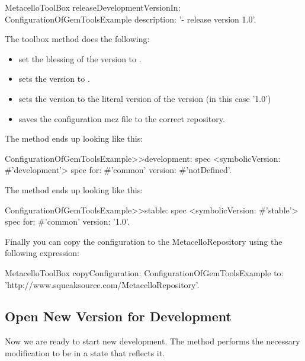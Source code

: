 \documentclass[a4paper,10pt,twoside]{book}
\begin{document}
\begin{code}{}
  MetacelloToolBox
     releaseDevelopmentVersionIn: ConfigurationOfGemToolsExample
     description: '- release version 1.0'.
\end{code}     

The toolbox method  does the following:
\begin{itemize}
\item set the blessing of the  version to .
\item sets the  version to .
\item sets the  version to the literal version of the  version (in this case '1.0')
\item saves the configuration mcz file to the correct repository.
\end{itemize}


The  method ends up looking like this:

\begin{code}{}
ConfigurationOfGemToolsExample>>development: spec
  <symbolicVersion: #'development'>
  spec for: #'common' version: #'notDefined'.
\end{code}  
  
The  method ends up looking like this:

\begin{code}{}
ConfigurationOfGemToolsExample>>stable: spec
  <symbolicVersion: #'stable'>
  spec for: #'common' version: '1.0'.
\end{code}  
  
Finally you can copy the configuration to the MetacelloRepository using the following expression:

\begin{code}{}
  MetacelloToolBox
     copyConfiguration: ConfigurationOfGemToolsExample
     to: 'http://www.squeaksource.com/MetacelloRepository'.
\end{code}


\subsection{Open New Version for Development}

Now we are ready to start new development. The method 
performs the necessary modification to be in a state that reflects it. 
\end{document}
